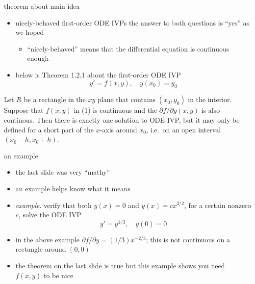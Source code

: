 \documentclass{beamer}
\begin{document}
\begin{frame}{theorem about main idea}

\begin{itemize}
\item nicely-behaved first-order ODE IVPs the answer to both questions is ``yes'' as we hoped
    \begin{itemize}
    \item ``nicely-behaved'' means that the differential equation is continuous enough
    \end{itemize}
\item below is Theorem 1.2.1 about the first-order ODE IVP
\begin{equation}
    y' = f(x,y), \quad y(x_0) = y_0
\end{equation}
\end{itemize}

\begin{theorem}
Let $R$ be a rectangle in the $xy$ plane that contains $(x_0,y_0)$ in the interior.  Suppose that $f(x,y)$ in (1) is continuous and the $\partial f/\partial y(x,y)$ is also continous.  Then there is exactly one solution to ODE IVP, but it may only be defined for a short part of the $x$-axis around $x_0$, i.e.~on an open interval $(x_0-h,x_0+h)$.
\end{theorem}
\end{frame}


\begin{frame}{an example}

\begin{itemize}
\item the last slide was very ``mathy''
\item an example helps know what it means
\item \emph{example}.  verify that both $y(x)=0$ and $y(x)=c x^{3/2}$, for a certain nonzero $c$, solve the ODE IVP
    $$y' = y^{1/3}, \quad y(0)=0$$

\vspace{35mm}
\item in the above example $\partial f/\partial y = (1/3)x^{-2/3}$; this is not continuous on a rectangle around $(0,0)$
\item the theorem on the last slide is true but this example shows you need $f(x,y)$ to be nice
\end{itemize}
\end{frame}
\end{document}
